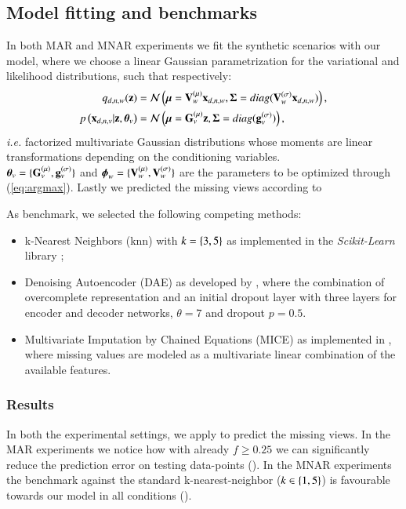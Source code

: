 \subsection{Model fitting and benchmarks}

In both MAR and MNAR experiments we fit the synthetic scenarios with our model, where we choose a linear Gaussian parametrization for the variational and likelihood distributions, such that respectively:
\begin{align}
\label{eq:encoder}
q_{d,n,w}(\mathbf{z}) &= \mathcal{N}\left(\boldsymbol{\mu}=\mathbf{V}_w^{(\mu)} \mathbf{x}_{d,n,w}, \boldsymbol{\Sigma} = diag(\mathbf{V}_w^{(\sigma)} \mathbf{x}_{d,n,w})\right), \\
\label{eq:decoder}
p\left(\mathbf{x}_{d,n,v}|\mathbf{z},\boldsymbol{\theta}_v\right) &= \mathcal{N}\left(\boldsymbol{\mu} = \mathbf{G}_v^{(\mu)} \mathbf{z}, \boldsymbol{\Sigma} = diag(\mathbf{g}_v^{(\sigma)})\right),
\end{align}
\textit{i.e.} factorized multivariate Gaussian distributions whose moments are linear transformations depending on the conditioning variables. \\
$\boldsymbol{\theta}_v = \{\mathbf{G}_v^{(\mu)}, \mathbf{g}_v^{(\sigma)}\}$ and $\boldsymbol{\phi}_w=\{\mathbf{V}_w^{(\mu)}, \mathbf{V}_w^{(\sigma)}\}$ are the parameters to be optimized through (\ref{eq:argmax}).
Lastly we predicted the missing views according to 

As benchmark, we selected the following competing methods:
\begin{itemize}
\item k-Nearest Neighbors (knn) with $k=\left\{3, 5\right\}$ as implemented in the \textit{Scikit-Learn} library \citep{sklearn};
\item  Denoising Autoencoder (DAE) as developed by \cite{dae}, where the combination of overcomplete representation and an initial dropout layer   with three layers for encoder and decoder networks, $\theta=7$ and dropout $p=0.5$.
\item Multivariate Imputation by Chained Equations (MICE) as implemented in \cite{mice}, where missing values are modeled as a multivariate linear combination of the available features.
\end{itemize}

\subsubsection{Results}
In both the experimental settings, we apply  to predict the missing views.
In the MAR experiments we notice how with already $f \geq 0.25$ we can significantly reduce the prediction error on testing data-points ().
In the MNAR experiments the benchmark against the standard k-nearest-neighbor ($k \in \left\{1,5\right\}$) is favourable towards our model in all conditions ().


